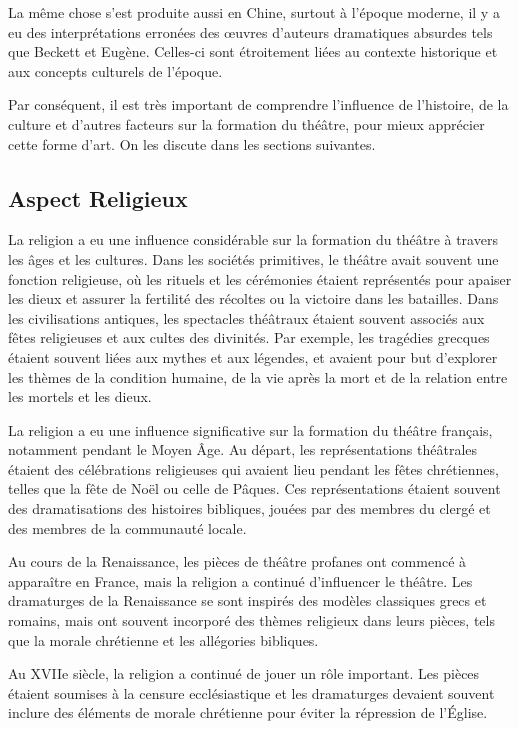 \documentclass[UTF8,a4paper,12pt]{ctexart}
\numberwithin{equation}{section}
\begin{document}
La même chose s'est produite aussi en Chine, surtout à l'époque moderne, il y a eu des interprétations erronées des œuvres d'auteurs dramatiques absurdes tels que Beckett et Eugène. Celles-ci sont étroitement liées au contexte historique et aux concepts culturels de l'époque.

Par conséquent, il est très important de comprendre l'influence de l'histoire, de la culture et d'autres facteurs sur la formation du théâtre, pour mieux apprécier cette forme d'art. On les discute dans les sections suivantes.

\subsection{Aspect Religieux}
La religion a eu une influence considérable sur la formation du théâtre à travers les âges et les cultures. Dans les sociétés primitives, le théâtre avait souvent une fonction religieuse, où les rituels et les cérémonies étaient représentés pour apaiser les dieux et assurer la fertilité des récoltes ou la victoire dans les batailles. Dans les civilisations antiques, les spectacles théâtraux étaient souvent associés aux fêtes religieuses et aux cultes des divinités. Par exemple, les tragédies grecques étaient souvent liées aux mythes et aux légendes, et avaient pour but d'explorer les thèmes de la condition humaine, de la vie après la mort et de la relation entre les mortels et les dieux.

La religion a eu une influence significative sur la formation du théâtre français, notamment pendant le Moyen Âge. Au départ, les représentations théâtrales étaient des célébrations religieuses qui avaient lieu pendant les fêtes chrétiennes, telles que la fête de Noël ou celle de Pâques. Ces représentations étaient souvent des dramatisations des histoires bibliques, jouées par des membres du clergé et des membres de la communauté locale.

Au cours de la Renaissance, les pièces de théâtre profanes ont commencé à apparaître en France, mais la religion a continué d'influencer le théâtre. Les dramaturges de la Renaissance se sont inspirés des modèles classiques grecs et romains, mais ont souvent incorporé des thèmes religieux dans leurs pièces, tels que la morale chrétienne et les allégories bibliques.

Au XVIIe siècle, la religion a continué de jouer un rôle important. Les pièces étaient soumises à la censure ecclésiastique et les dramaturges devaient souvent inclure des éléments de morale chrétienne pour éviter la répression de l'Église.
\end{document}
